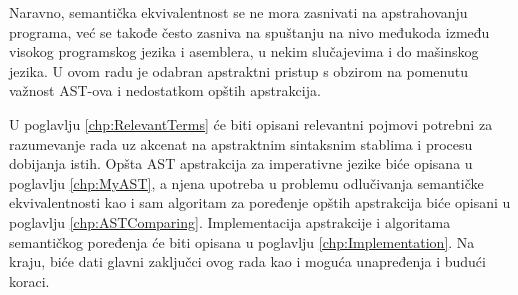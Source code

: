 Naravno, semantička ekvivalentnost se ne mora zasnivati na apstrahovanju programa, već se takođe često zasniva na spuštanju na nivo međukoda između visokog programskog jezika i asemblera, u nekim slučajevima i do mašinskog jezika. U ovom radu je odabran apstraktni pristup s obzirom na pomenutu važnost AST-ova i nedostatkom opštih apstrakcija. 

U poglavlju \ref{chp:RelevantTerms} će biti opisani relevantni pojmovi potrebni za razumevanje rada uz akcenat na apstraktnim sintaksnim stablima i procesu dobijanja istih. Opšta AST apstrakcija za imperativne jezike biće opisana u poglavlju \ref{chp:MyAST}, a njena upotreba u problemu odlučivanja semantičke ekvivalentnosti kao i sam algoritam za poređenje opštih apstrakcija biće opisani u poglavlju \ref{chp:ASTComparing}. Implementacija apstrakcije i algoritama semantičkog poređenja će biti opisana u poglavlju \ref{chp:Implementation}. Na kraju, biće dati glavni zaključci ovog rada kao i moguća unapređenja i budući koraci. 

